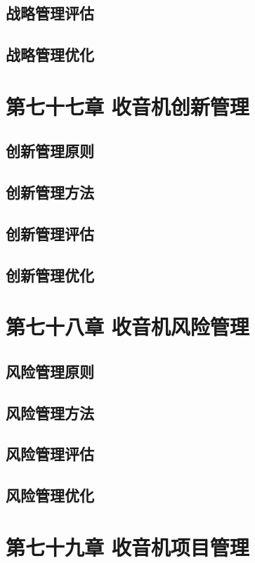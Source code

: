 \documentclass[12pt,UTF8]{ctexbook}
\begin{document}
\section{战略管理评估}
\section{战略管理优化}

\chapter{第七十七章 收音机创新管理}

\section{创新管理原则}
\section{创新管理方法}
\section{创新管理评估}
\section{创新管理优化}

\chapter{第七十八章 收音机风险管理}

\section{风险管理原则}
\section{风险管理方法}
\section{风险管理评估}
\section{风险管理优化}

\chapter{第七十九章 收音机项目管理}
\end{document}
